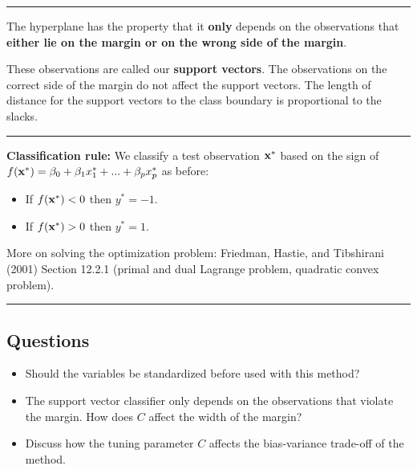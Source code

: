 \documentclass[]{article}
\providecommand{\tightlist}{%
  \setlength{\itemsep}{0pt}\setlength{\parskip}{0pt}}
\begin{document}
\begin{center}\rule{0.5\linewidth}{\linethickness}\end{center}

The hyperplane has the property that it \textbf{only} depends on the
observations that \textbf{either lie on the margin or on the wrong side
of the margin}.

These observations are called our \textbf{support vectors}. The
observations on the correct side of the margin do not affect the support
vectors. The length of distance for the support vectors to the class
boundary is proportional to the slacks.

\begin{center}\rule{0.5\linewidth}{\linethickness}\end{center}

\textbf{Classification rule:} We classify a test observation
\({\bf x}^*\) based on the sign of
\(f({\bf x}^*)=\beta_0+\beta_1 x_1^*+...+\beta_p x_p^*\) as before:

\begin{itemize}
\tightlist
\item
  If \(f({\bf x}^*)<0\) then \(y^*=-1\).
\item
  If \(f({\bf x}^*)>0\) then \(y^*=1\).
\end{itemize}

More on solving the optimization problem: Friedman, Hastie, and
Tibshirani (2001) Section 12.2.1 (primal and dual Lagrange problem,
quadratic convex problem).

\begin{center}\rule{0.5\linewidth}{\linethickness}\end{center}

\hypertarget{questions-1}{%
\subsection{Questions}\label{questions-1}}

\begin{itemize}
\tightlist
\item
  Should the variables be standardized before used with this method?
\item
  The support vector classifier only depends on the observations that
  violate the margin. How does \(C\) affect the width of the margin?\\
\item
  Discuss how the tuning parameter \(C\) affects the bias-variance
  trade-off of the method.
\end{itemize}
\end{document}
